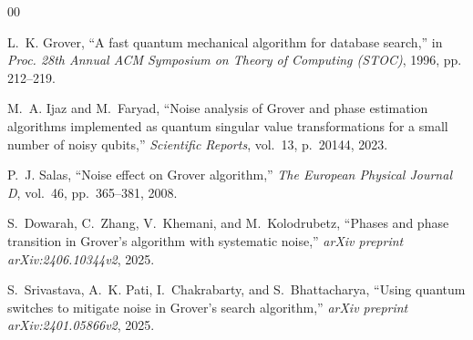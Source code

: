 \documentclass[conference]{IEEEtran}
\begin{document}
\balance
\begin{thebibliography}{00}

L.~K. Grover, ``A fast quantum mechanical algorithm for database search,''
in \textit{Proc. 28th Annual ACM Symposium on Theory of Computing (STOC)},
1996, pp. 212--219.

M.~A. Ijaz and M.~Faryad, ``Noise analysis of Grover and phase estimation
algorithms implemented as quantum singular value transformations for a small
number of noisy qubits,'' \textit{Scientific Reports}, vol.~13, p.~20144, 2023.

P.~J. Salas, ``Noise effect on Grover algorithm,''
\textit{The European Physical Journal D}, vol.~46, pp.~365--381, 2008.

S.~Dowarah, C.~Zhang, V.~Khemani, and M.~Kolodrubetz,
``Phases and phase transition in Grover's algorithm with systematic noise,''
\textit{arXiv preprint arXiv:2406.10344v2}, 2025.

S.~Srivastava, A.~K. Pati, I.~Chakrabarty, and S.~Bhattacharya,
``Using quantum switches to mitigate noise in Grover's search algorithm,''
\textit{arXiv preprint arXiv:2401.05866v2}, 2025.

\end{thebibliography}
\end{document}
